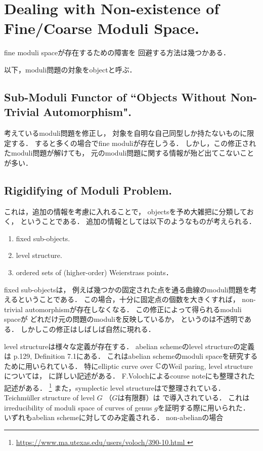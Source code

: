 \documentclass[a4paper]{jsarticle}
\begin{document}
\section{Dealing with Non-existence of Fine/Coarse Moduli Space.}
    fine moduli spaceが存在するための障害を
    回避する方法は幾つかある．
    
    以下，moduli問題の対象をobjectと呼ぶ．

    \subsection{Sub-Moduli Functor of ``Objects Without Non-Trivial Automorphism".}
    考えているmoduli問題を修正し，
    対象を自明な自己同型しか持たないものに限定する．
    すると多くの場合でfine moduliが存在しうる．
    しかし，この修正されたmoduli問題が解けても，
    元のmoduli問題に関する情報が殆ど出てこないことが多い．

    \subsection{Rigidifying of Moduli Problem.}
    これは，追加の情報を考慮に入れることで，
    objectsを予め大雑把に分類しておく，
    ということである．
    追加の情報としては以下のようなものが考えられる．
    \begin{enumerate}
        \item fixed sub-objects.
        \item level structure.
        \item ordered sets of (higher-order) Weierstrass points．
    \end{enumerate}

    fixed sub-objectsは，
    例えば幾つかの固定された点を通る曲線のmoduli問題を考えるということである．
    この場合，十分に固定点の個数を大きくすれば，
    non-trivial automorphismが存在しなくなる．
    この修正によって得られるmoduli spaceが
    どれだけ元の問題のmoduliを反映しているか，
    というのは不透明である．
    しかしこの修正はしばしば自然に現れる．

    level structureは様々な定義が存在する．
    abelian schemeのlevel structureの定義は
    \cite{GIT} p.129, Definition 7.1にある．
    これはabelian schemeのmoduli spaceを研究するために用いられている．
    特にelliptic curve over $\mathbb{C}$のWeil paring, level structureについては，
    \cite{DiaShur}に詳しい記述がある．
    F.Volochによるcourse noteにも整理された記述がある．
    \footnote{\url{ https://www.ma.utexas.edu/users/voloch/390-10.html }}
    また，symplectic level structureは\cite{CFMSC}で整理されている．
    Teichm\"uller structure of level $G$ （$G$は有限群）は
    \cite{IrrOfMg}で導入されている．
    これはirreducibility of moduli space of curves of genus $g$を証明する際に用いられた．
    いずれもabelian schemeに対してのみ定義される．
    non-abelianの場合
\end{document}
